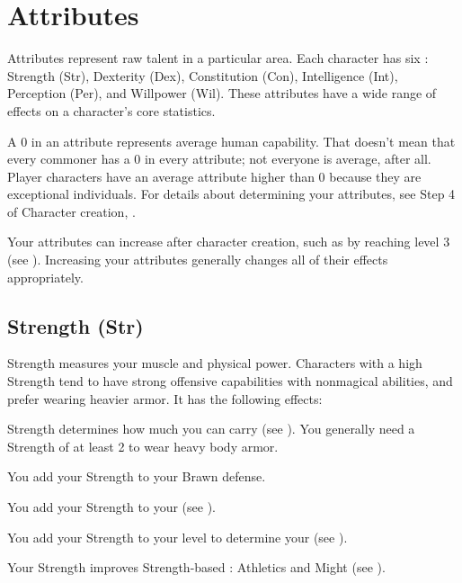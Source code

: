 \section{Attributes}\label{Attributes}

  Attributes represent raw talent in a particular area.
  Each character has six : Strength (Str), Dexterity (Dex), Constitution (Con), Intelligence (Int), Perception (Per), and Willpower (Wil).
  These attributes have a wide range of effects on a character's core statistics.

  A 0 in an attribute represents average human capability.
  That doesn't mean that every commoner has a 0 in every attribute; not everyone is average, after all.
  Player characters have an average attribute higher than 0 because they are exceptional individuals.
  For details about determining your attributes, see Step 4 of Character creation, .

  Your attributes can increase after character creation, such as by reaching level 3 (see ).
  Increasing your attributes generally changes all of their effects appropriately.

  \subsection{Strength (Str)}\label{Strength}
    {
      Strength measures your muscle and physical power.
      Characters with a high Strength tend to have strong offensive capabilities with nonmagical abilities, and prefer wearing heavier armor.
      It has the following effects:
      \begin{raggeditemize}
        \item Strength determines how much you can carry (see ).
          You generally need a Strength of at least 2 to wear heavy body armor.
        \item You add your Strength to your Brawn defense.
        \item You add your Strength to your  (see ).
        \item You add your Strength to your level to determine your  (see ).
        \item Your Strength improves Strength-based : Athletics and Might (see ).
      \end{raggeditemize}
    }

